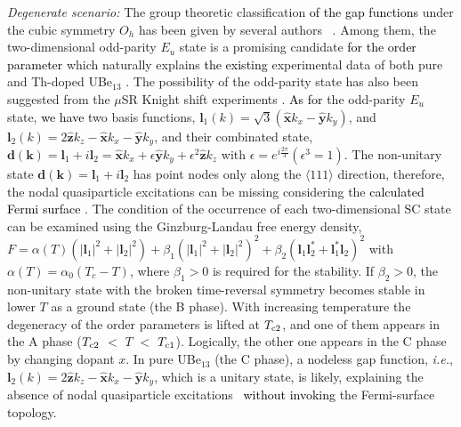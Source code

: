 \documentclass[twocolumn, prl]{revtex4}%
\newcommand{\correct}[1]{\textcolor{black}{#1}}
\begin{document}
\textit{Degenerate scenario: } 
The group theoretic classification \correct{of the gap functions} under the  cubic symmetry $O_{h}$ has been given by several authors~ \cite{Volovik_JETP_1985, Blount_PRB_1985, Sigrist_RevModPhys_1991,Ozaki_Machida_Ohmi_PTP_1985}.
Among them, the two-dimensional  odd-parity  $E_{u}$ state is  a promising candidate \correct{for the order parameter} which naturally explains \correct{the existing} experimental data of both pure and Th-doped  UBe$_{13}$
 \cite{Endnote_Eg_symmetry}. 
The possibility of  the odd-parity state has  also been suggested from the $\mu$SR  Knight shift  experiments
  \cite{Sonier_muSR}.
\color{black}
\correct{As for}  the odd-parity $E_{u}$ state,
\correct{we have} two basis  functions, $\bm{l}_{1} (k) = \sqrt{3} (\hat{ \bm{x} } k_{x} - \hat{ \bm{y} } k_{y}  )$, and
 $\bm{l}_{2} (k) = 2 \hat{ \bm{z} } k_{z} - \hat{ \bm{x} } k_{x}  - \hat{ \bm{y} } k_{y}   $, 
 and their  combinated state, 
 $\bm{d (k)} = \bm{l}_{1} + i \bm{l}_{2} =  \hat{ \bm{x} } k_{x} + \epsilon \hat{ \bm{y} } k_{y} +  \epsilon^2 \hat{ \bm{z} } k_{z} $
 with $\epsilon = e^{i \frac{2 \pi }{3} }  (\epsilon^3 = 1)$. 
The non-unitary state  $\bm{d (k)} = \bm{l}_{1} + i \bm{l}_{2} $ has  point  nodes only   along  the $\langle111\rangle$ direction, 
  therefore,  the nodal  quasiparticle excitations can be missing
  considering the \correct{calculated Fermi surface} 
 \cite{Takegahara_PhysicaB_2000, Maehira_PhysicaB_2002}.
The condition of the occurrence of each  two-dimensional SC state can be examined using the Ginzburg-Landau free energy density,
 $F = \alpha(T) (| \bm{l}_{1} |^2 + | \bm{l}_{2} |^2 ) + \beta_{1} (| \bm{l}_{1} |^2 + | \bm{l}_{2} |^2 )^2  + \beta_{2} ( \bm{l}_{1} \bm{l}^{*}_{2} +  \bm{l}^{*}_{1} \bm{l}_{2}  )^2 $ with 
  $\alpha(T) = \alpha_{0} (T_{c} -T ) $,
 where $\beta_{1} > 0$ is required for the stability. 
If $\beta_{2} > 0$, the non-unitary  state with the broken time-reversal symmetry becomes stable in lower $T$  
 as a ground state (the B phase).
With increasing temperature the degeneracy of the order parameters is lifted at $T_{\rm c2}$,
  and one of them appears in 
 the A phase ($T_{\rm c2}$ $<$ $T$ $<$ $T_{\rm c1}$).
Logically, 
 the other one appears in the C phase by changing dopant $x$.
In  pure UBe$_{13}$ (the C phase),   a nodeless gap function, \textit{i.e.}, 
 $\bm{l}_{2} (k) = 2 \hat{ \bm{z} } k_{z} - \hat{ \bm{x} } k_{x}  - \hat{ \bm{y} } k_{y} $, which is a unitary state, 
  is likely, 
  explaining the absence of nodal quasiparticle excitations~\cite{YShimizu_PRL_2015}
\correct{without invoking} the Fermi-surface topology.
\end{document}

